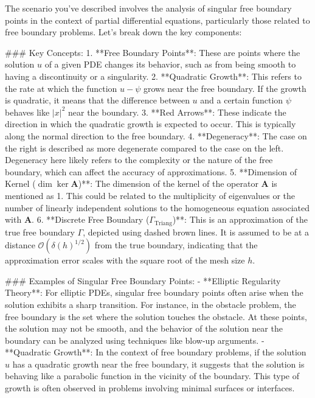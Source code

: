 The scenario you've described involves the analysis of singular free boundary points in the context of partial differential equations, particularly those related to free boundary problems. Let's break down the key components:

### Key Concepts:
1. **Free Boundary Points**: These are points where the solution \( u \) of a given PDE changes its behavior, such as from being smooth to having a discontinuity or a singularity.
2. **Quadratic Growth**: This refers to the rate at which the function \( u - \psi \) grows near the free boundary. If the growth is quadratic, it means that the difference between \( u \) and a certain function \( \psi \) behaves like \( |x|^2 \) near the boundary.
3. **Red Arrows**: These indicate the direction in which the quadratic growth is expected to occur. This is typically along the normal direction to the free boundary.
4. **Degeneracy**: The case on the right is described as more degenerate compared to the case on the left. Degeneracy here likely refers to the complexity or the nature of the free boundary, which can affect the accuracy of approximations.
5. **Dimension of Kernel (\(\dim \ker \mathbf{A}\))**: The dimension of the kernel of the operator \(\mathbf{A}\) is mentioned as 1. This could be related to the multiplicity of eigenvalues or the number of linearly independent solutions to the homogeneous equation associated with \(\mathbf{A}\).
6. **Discrete Free Boundary (\(\Gamma_{\text{Triang}}\))**: This is an approximation of the true free boundary \(\Gamma\), depicted using dashed brown lines. It is assumed to be at a distance \(\mathcal{O}(\delta(h)^{1/2})\) from the true boundary, indicating that the approximation error scales with the square root of the mesh size \(h\).

### Examples of Singular Free Boundary Points:
- **Elliptic Regularity Theory**: For elliptic PDEs, singular free boundary points often arise when the solution exhibits a sharp transition. For instance, in the obstacle problem, the free boundary is the set where the solution touches the obstacle. At these points, the solution may not be smooth, and the behavior of the solution near the boundary can be analyzed using techniques like blow-up arguments.
- **Quadratic Growth**: In the context of free boundary problems, if the solution \( u \) has a quadratic growth near the free boundary, it suggests that the solution is behaving like a parabolic function in the vicinity of the boundary. This type of growth is often observed in problems involving minimal surfaces or interfaces.

